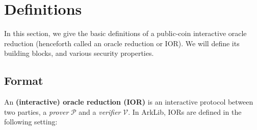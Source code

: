 \section{Definitions}\label{sec:oracle_reductions_defs}

In this section, we give the basic definitions of a public-coin interactive oracle reduction
(henceforth called an oracle reduction or IOR). We will define its building blocks, and various
security properties.

\subsection{Format}\label{sec:oracle_reductions_defs_format}

An \textbf{(interactive) oracle reduction (IOR)} is an interactive protocol between two parties, a
\emph{prover} $\mathcal{P}$ and a \emph{verifier} $\mathcal{V}$. In ArkLib, IORs are defined in the
following setting:
